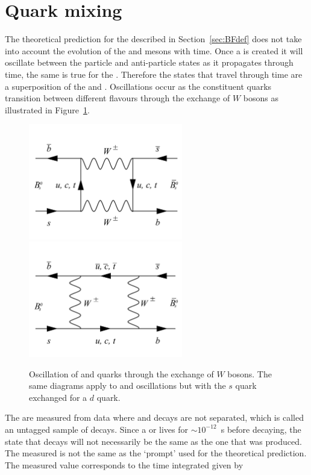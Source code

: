 {\section{Quark mixing}
\label{sec:quarkmaixing}
The theoretical prediction for the \bmumu \BFs described in Section~\ref{sec:BFdef} does not take into account the evolution of the \bsd and \barbsd mesons with time. Once a \bsd is created it will oscillate between the particle and anti-particle states as it propagates through time, the same is true for the \barbsd. Therefore the states that travel through time are a superposition of the \bsd and \barbsd. Oscillations occur as the constituent quarks transition between different flavours through the exchange of $W$ bosons as illustrated in Figure~\ref{fig:Oscl_diag}.
\begin{figure}[tbp]
    \centering
        \includegraphics[width=0.6\textwidth]{./Figs/Theory/Oscillation_1.pdf}
        \includegraphics[width=0.6\textwidth]{./Figs/Theory/Oscillation_2.pdf}
    \caption{Oscillation of \bs and \barbs quarks through the exchange of $W$ bosons. The same diagrams apply to \bd and \barbd oscillations but with the $s$ quark exchanged for a $d$ quark.}
    \label{fig:Oscl_diag}
\end{figure}
The \BFs are measured from data where \bsd and \barbsd decays are not separated, which is called an untagged sample of \bmumu decays. Since a \bsd or \barbsd lives for $\sim10^{-12}$~s before decaying, the state that decays will not necessarily be the same as the one that was produced. The measured \BF is not the same as the `prompt' \BF used for the theoretical prediction. The measured value corresponds to the time integrated \BF given by~\cite{DeBruyn:2012wj}
}
